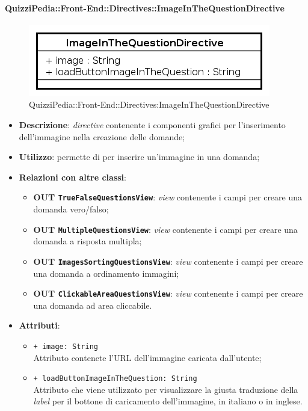 \paragraph{QuizziPedia::Front-End::Directives::ImageInTheQuestionDirective}
\begin{figure} [ht]
	\centering
	\includegraphics[scale=0.80]{UML/Classi/Front-End/QuizziPedia_Front-end_ImageInTheQuestionDirective.png}
	\caption{QuizziPedia::Front-End::Directives:ImageInTheQuestionDirective}
\end{figure} \FloatBarrier
\begin{itemize}
	\item \textbf{Descrizione}: \textit{directive} contenente i componenti grafici per l'inserimento dell'immagine nella creazione delle domande;
	\item \textbf{Utilizzo}: permette di per inserire un'immagine in una domanda;
	\item \textbf{Relazioni con altre classi}:
	\begin{itemize}
		\item \textbf{OUT \texttt{TrueFalseQuestionsView}}: \textit{view} contenente i campi per creare una domanda vero/falso; 
		\item \textbf{OUT \texttt{MultipleQuestionsView}}:  \textit{view} contenente i campi per creare una domanda a risposta multipla; 
		\item \textbf{OUT \texttt{ImagesSortingQuestionsView}}: \textit{view} contenente i campi per creare una domanda a ordinamento immagini;
		\item \textbf{OUT \texttt{ClickableAreaQuestionsView}}:  \textit{view} contenente i campi per creare una domanda ad area cliccabile.
	\end{itemize}
	\item \textbf{Attributi}:
	\begin{itemize}
		\item \texttt{+ image: String} \\ Attributo contenete l'URL dell'immagine caricata dall'utente;
		\item \texttt{+ loadButtonImageInTheQuestion: String} \\ Attributo che viene utilizzato per visualizzare la giusta traduzione della \textit{label} per il bottone di caricamento dell'immagine, in italiano o in inglese. 
	\end{itemize}
\end{itemize}